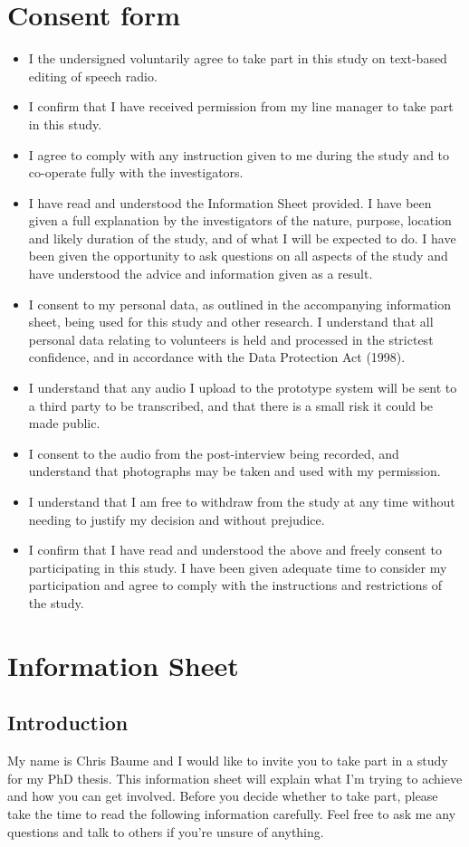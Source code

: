 \section{Consent form}
\begin{itemize}
\item I the undersigned voluntarily agree to take part in this study on
text-based editing of speech radio.
\item I confirm that I have received permission from my line manager to take
part in this study.
\item I agree to comply with any instruction given to me during the study and
to co-operate fully with the investigators.
\item I have read and understood the Information Sheet provided. I have been
given a full explanation by the investigators of the nature, purpose, location
and likely duration of the study, and of what I will be expected to do. I have
been given the opportunity to ask questions on all aspects of the study and
have understood the advice and information given as a result.
\item I consent to my personal data, as outlined in the accompanying
information sheet, being used for this study and other research.  I understand
that all personal data relating to volunteers is held and processed in the
strictest confidence, and in accordance with the Data Protection Act (1998).
\item I understand that any audio I upload to the prototype system will be sent
to a third party to be transcribed, and that there is a small risk it could be
made public. 
\item I consent to the audio from the post-interview being recorded, and
understand that photographs may be taken and used with my permission. 
\item I understand that I am free to withdraw from the study at any time
without needing to justify my decision and without prejudice.
\item I confirm that I have read and understood the above and freely consent to
participating in this study.  I have been given adequate time to consider my
participation and agree to comply with the instructions and restrictions of the
study.
\end{itemize}

\section{Information Sheet}
\subsection{Introduction}
My name is Chris Baume and I would like to invite you to take part in a study
for my PhD thesis. This information sheet will explain what I’m trying to
achieve and how you can get involved. Before you decide whether to take part,
please take the time to read the following information carefully. Feel free to
ask me any questions and talk to others if you’re unsure of anything.

